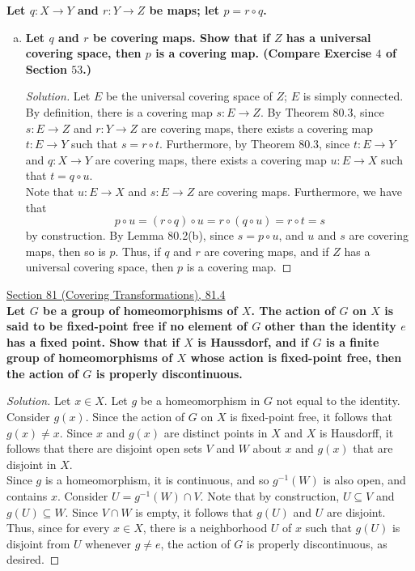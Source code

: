 \documentclass[11pt]{article}
\newenvironment{solution}
  {\renewcommand\qedsymbol{$\blacksquare$}\begin{proof}[Solution]}
  {\end{proof}}
\begin{document}
\textbf{Let $q\colon X \rightarrow Y$ and $r\colon Y \rightarrow Z$ be maps; let $p = r \circ q$.}
\begin{enumerate}[a)]
    \item \textbf{Let $q$ and $r$ be covering maps. Show that if $Z$ has a universal covering space, then $p$ is a covering map. (Compare Exercise $4$ of Section $53$.)}
    \begin{solution}
    
    Let $E$ be the universal covering space of $Z$; $E$ is simply connected. By definition, there is a covering map $s \colon E \rightarrow Z$. 
    By Theorem 80.3, since $s \colon E \rightarrow Z$ and $r \colon Y \rightarrow Z$ are covering maps, there exists a covering map $t \colon E \rightarrow Y$ such that $s = r \circ t$. 
    Furthermore, by Theorem 80.3, since $t \colon E \rightarrow Y$ and $q \colon X \rightarrow Y$ are covering maps, there exists a covering map $u\colon E \rightarrow X$ such that $t = q \circ u$. \\

    Note that $u \colon E \rightarrow X$ and $s \colon E \rightarrow Z$ are covering maps. Furthermore, we have that
    \[
        p \circ u = (r \circ q) \circ u = r \circ (q \circ u) = r \circ t = s
    \]
    by construction. By Lemma 80.2(b), since $s = p \circ u$, and $u$ and $s$ are covering maps, then so is $p$. 
    Thus, if $q$ and $r$ are covering maps, and if $Z$ has a universal covering space, then $p$ is a covering map.
    \end{solution}
\end{enumerate}




\newpage

\underline{Section 81 (Covering Transformations), 81.4} \\

\textbf{Let $G$ be a group of homeomorphisms of $X$. The action of $G$ on $X$ is said to be fixed-point free if no element of $G$ other than the identity $e$ has a fixed point. 
Show that if $X$ is Haussdorf, and if $G$ is a finite group of homeomorphisms of $X$ whose action is fixed-point free, then the action of $G$ is properly discontinuous.}

\begin{solution}
Let $x \in X$. Let $g$ be a homeomorphism in $G$ not equal to the identity. Consider $g(x)$. 
Since the action of $G$ on $X$ is fixed-point free, it follows that $g(x) \neq x$. Since $x$ and $g(x)$ are distinct points in $X$ and $X$ is Hausdorff,
it follows that there are disjoint open sets $V$ and $W$ about $x$ and $g(x)$ that are disjoint in $X$. \\

Since $g$ is a homeomorphism, it is continuous, and so $g^{-1}(W)$ is also open, and contains $x$. Consider $U = g^{-1}(W) \cap V$. 
Note that by construction, $U \subseteq V$ and $g(U) \subseteq W$. Since $V \cap W$ is empty, it follows that $g(U)$ and $U$ are disjoint. \\

Thus, since for every $x \in X$, there is a neighborhood $U$ of $x$ such that $g(U)$ is disjoint from $U$ whenever $g \neq e$, the action of $G$ is properly discontinuous, as desired.
\end{solution}
\end{document}
